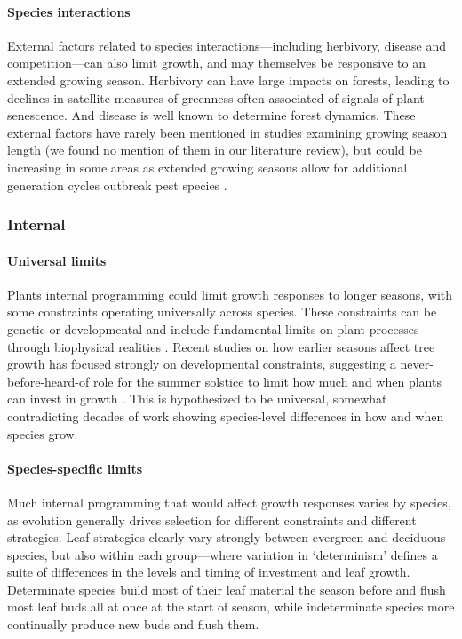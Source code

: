 \documentclass[11pt]{article}
\begin{document}
\paragraph{Species interactions} %

External factors related to species interactions---including herbivory, disease and competition---can also limit growth, and may themselves be responsive to an extended growing season. Herbivory can have large impacts on forests, leading to declines in satellite measures of greenness often associated of signals of plant senescence. And disease is well known to determine forest dynamics. These external factors have rarely been mentioned in studies examining growing season length (we found no mention of them in our literature review), but could be increasing in some areas as extended growing seasons allow for additional generation cycles outbreak pest species \citep{mitton2012mountain,lange2006thresholds}.

\subsubsection*{Internal}

\paragraph{Universal limits} 
Plants internal programming could limit growth responses to longer seasons, with some constraints operating universally across species. These constraints can be genetic or developmental and include fundamental limits on plant processes through biophysical realities \citep[e.g., allometry, chemical reaction limits, and genetic architecture that may limit what trait combinations are possible,][]{ackerly2000evolution}. Recent studies on how earlier seasons affect tree growth has focused strongly on developmental constraints, suggesting a never-before-heard-of role for the summer solstice to limit how much and when plants can invest in growth \citep{zohner2023effect}. This is hypothesized to be universal, somewhat contradicting decades of work showing species-level differences in how and when species grow. %

\paragraph{Species-specific limits}
Much internal programming that would affect growth responses varies by species, as evolution generally drives selection for different constraints and different strategies. Leaf strategies clearly vary strongly between evergreen and deciduous species, but also within each group---where variation in `determinism' defines a suite of differences in the levels and timing of investment and leaf growth. Determinate species build most of their leaf material the season before and flush most leaf buds all at once at the start of season, while indeterminate species more continually produce new buds and flush them. 
\end{document}

